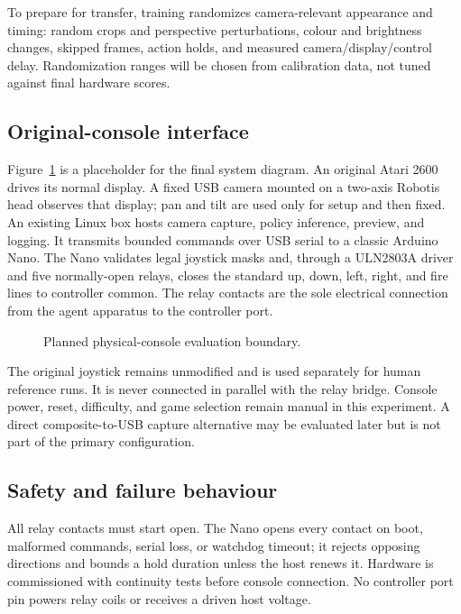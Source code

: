\documentclass[11pt]{article}
\newcommand{\todo}[1]{\textcolor{red}{[TODO: #1]}}
\begin{document}
To prepare for transfer, training randomizes camera-relevant appearance and
timing: random crops and perspective perturbations, colour and brightness
changes, skipped frames, action holds, and measured camera/display/control delay.  Randomization
ranges will be chosen from calibration data, not tuned against final hardware
scores.

\subsection{Original-console interface}

Figure~\ref{fig:system} is a placeholder for the final system diagram.  An
original Atari 2600 drives its normal display.  A fixed USB camera mounted on
a two-axis Robotis head observes that display; pan and tilt are used only for
setup and then fixed.  An existing Linux box hosts camera capture, policy
inference, preview, and logging.  It transmits bounded commands over USB
serial to a classic Arduino Nano.  The Nano validates legal joystick masks
and, through a ULN2803A driver and five normally-open relays, closes the
standard up, down, left, right, and fire lines to controller common.  The
relay contacts are the sole electrical connection from the agent apparatus to
the controller port.

\begin{figure}[t]
\centering
\fbox{\parbox{0.9\linewidth}{\centering
\todo{System figure: Atari $\rightarrow$ display $\rightarrow$ fixed camera
$\rightarrow$ Linux box $\rightarrow$ Nano $\rightarrow$ relay contacts
$\rightarrow$ Atari controller port.  Label the synchronized log.}}}
\caption{Planned physical-console evaluation boundary.}
\label{fig:system}
\end{figure}

The original joystick remains unmodified and is used separately for human
reference runs.  It is never connected in parallel with the relay bridge.
Console power, reset, difficulty, and game selection remain manual in this
experiment.  A direct composite-to-USB capture alternative may be evaluated
later but is not part of the primary configuration.

\subsection{Safety and failure behaviour}

All relay contacts must start open.  The Nano opens every contact on boot,
malformed commands, serial loss, or watchdog timeout; it rejects opposing
directions and bounds a hold duration unless the host renews it.  Hardware is
commissioned with continuity tests before console connection.  No controller
port pin powers relay coils or receives a driven host voltage.
\end{document}
